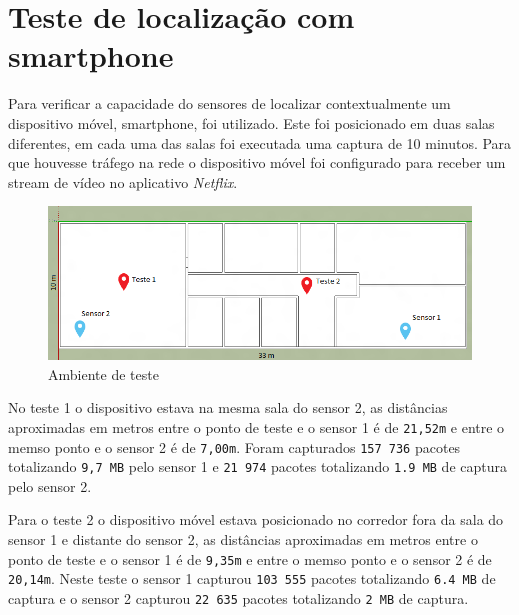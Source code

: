 \section{Teste de localização com smartphone}
\label{sec:teste-smarphone}

Para verificar a capacidade do sensores de localizar contextualmente um
dispositivo móvel, smartphone, foi utilizado. Este foi posicionado em duas salas
diferentes, em cada uma das salas foi executada uma captura de 10 minutos. Para
que houvesse tráfego na rede o dispositivo móvel foi configurado para receber um
stream de vídeo no aplicativo \emph{Netflix}.

\begin{figure}[htb]
	\caption{\label{fig-planta-baixa}Ambiente de teste}
	\begin{center}
		\includegraphics[width=1\textwidth]{060-testes/data-analisis/planta-baixa-smartphone.png}
	\end{center}
\end{figure}


No teste 1 o dispositivo estava na mesma sala do sensor 2, as distâncias
aproximadas em metros entre o ponto de teste e o sensor 1 é de \texttt{21,52m} e
entre o memso ponto e o sensor 2 é de \texttt{7,00m}. Foram capturados
\texttt{157 736} pacotes totalizando \texttt{9,7 MB} pelo sensor 1 e \texttt{21
974} pacotes totalizando \texttt{1.9 MB} de captura pelo sensor 2.

Para o teste 2 o dispositivo móvel estava posicionado no corredor fora da sala
do sensor 1 e distante do sensor 2, as distâncias aproximadas em metros entre o
ponto de teste e o sensor 1 é de \texttt{9,35m} e entre o memso ponto e o sensor
2 é de \texttt{20,14m}. Neste teste o sensor 1 capturou \texttt{103 555} pacotes
totalizando \texttt{6.4 MB}  de captura e o sensor 2 capturou \texttt{22 635}
pacotes totalizando \texttt{2 MB} de captura.

